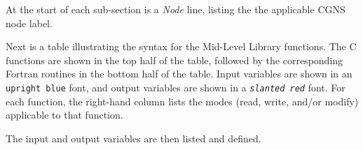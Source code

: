 At the start of each sub-section is a \textit{Node} line, listing the
the applicable CGNS node label.

Next is a table illustrating the syntax for the Mid-Level Library
functions.
The C functions are shown in the top half of the table, followed by the
corresponding Fortran routines in the bottom half of the table.
Input variables are shown in an \textcolor{input}{\texttt{upright blue}}
font, and output variables are shown in a
\textcolor{output}{\texttt{\textit{slanted red}}} font.
For each function, the right-hand column lists the modes (read, write,
and/or modify) applicable to that function.

The input and output variables are then listed and defined.
